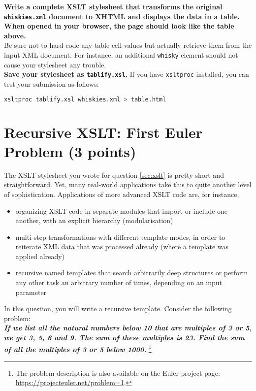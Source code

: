 \documentclass[a4paper, 12pt]{scrartcl}
\begin{document}
\newpage

\noindent \textbf{Write a complete XSLT stylesheet that transforms the original \texttt{whiskies.xml} document to XHTML and displays the data in a table. When opened in your browser, the page should look like the table above.}  \\

\noindent Be sure not to hard-code any table cell values but actually retrieve them from the input XML document. For instance, an additional \texttt{whisky} element should not cause your stylesheet any trouble.\\

\noindent \textbf{Save your stylesheet as \texttt{tablify.xsl}.} If you have \texttt{xsltproc} installed, you can test your submission as follows:

\begin{lstlisting}[language=bash]
  xsltproc tablify.xsl whiskies.xml > table.html
\end{lstlisting}
 

\section{Recursive XSLT: First Euler Problem (3 points)}

The XSLT stylesheet you wrote for question \ref{sec:xslt} is pretty short and straightforward. Yet, many real-world applications take this to quite another level of sophistication. Applications of more advanced XSLT code are, for instance, 

\begin{itemize}
\item organizing XSLT code in separate modules that import or include one another, with an explicit hierarchy (modularisation)
\item multi-step transformations with different template modes, in order to reiterate XML data that was processed already (where a template was applied already)
\item recursive named templates that search arbitrarily deep structures or perform any other task an arbitrary number of times, depending on an input parameter
\end{itemize}

\noindent In this question, you will write a recursive template. Consider the following problem: \\

\noindent \textit{\textbf{If we list all the natural numbers below 10 that are multiples of 3 or 5, we get 3, 5, 6 and 9. The sum of these multiples is 23. Find the sum of all the multiples of 3 or 5 below 1000.}} \footnote{The problem description is also available on the Euler project page: \url{https://projecteuler.net/problem=1}.} \\
\end{document}
